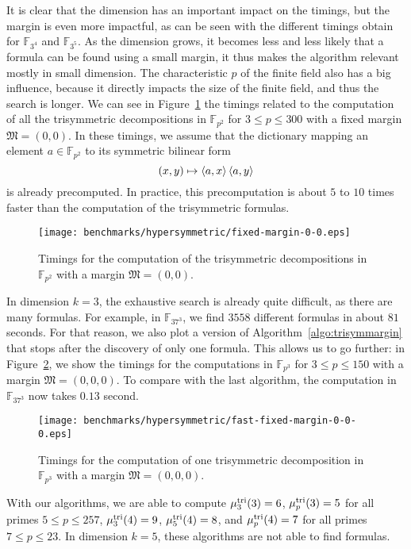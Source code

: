 It is clear that the dimension has an important impact on the timings, but the
margin is even more impactful, as can be seen with the different timings obtain
for $\mathbb{F}_{3^4}$ and $\mathbb{F}_{3^5}$. As the dimension grows, it
becomes less and less likely that a formula can be found using a small margin,
it thus makes the algorithm relevant mostly in small dimension. The
characteristic $p$ of the finite field also has a big influence, because it
directly impacts the size of the finite field, and thus the search is longer. We
can see in Figure~\ref{fig:fixed-margin-0-0} the timings related to the
computation of all the trisymmetric decompositions in $\mathbb{F}_{p^2}$ for
$3\leq p\leq 300$ with a fixed margin $\mathfrak M =(0,0)$. In these timings, we
assume that the dictionary mapping an element $a\in\mathbb{F}_{p^2}$ to its
symmetric bilinear form
\[
  (x,y)\mapsto\left\langle a,x\right\rangle\left\langle a,y\right\rangle
\]
is already precomputed. In practice, this precomputation is about $5$ to $10$
times faster than the computation of the trisymmetric formulas.
\begin{figure}
  \centering
  \texttt{[image: benchmarks/hypersymmetric/fixed-margin-0-0.eps]}
  \caption{Timings for the computation of the trisymmetric decompositions in
    $\mathbb{F}_{p^2}$ with a margin $\mathfrak M=(0,0)$.}
  \label{fig:fixed-margin-0-0}
\end{figure}
In dimension $k=3$, the exhaustive search is already quite difficult, as there
are many formulas. For example, in $\mathbb{F}_{37^3}$, we find $3558$ different
formulas in about $81$ seconds. For that reason, we also plot a version of
Algorithm~\ref{algo:trisymmargin} that stops after the discovery of only one formula.
This allows us to go further: in Figure~\ref{fig:fast-fixed-margin-0-0-0}, we
show the timings for the computations in $\mathbb{F}_{p^3}$ for $3\leq p\leq
150$ with a margin $\mathfrak M=(0,0,0)$. To compare with the last algorithm,
the computation in $\mathbb{F}_{37^3}$ now takes $0.13$ second.
\begin{figure}
  \centering
  \texttt{[image: benchmarks/hypersymmetric/fast-fixed-margin-0-0-0.eps]}
  \caption{Timings for the computation of one trisymmetric decomposition in
    $\mathbb{F}_{p^3}$ with a margin $\mathfrak M=(0,0,0)$.}
  \label{fig:fast-fixed-margin-0-0-0}
\end{figure}
With our algorithms, we are able to compute $\mu^{\textrm{tri}}_3(3)=6$,
$\mu^{\textrm{tri}}_p(3)=5$ for all primes $5\leq p\leq 257$,
$\mu^{\textrm{tri}}_3(4)=9$, $\mu^{\textrm{tri}}_5(4)=8$, and $\mu^{\textrm{tri}}_p(4)=7$ for all primes $7\leq p\leq 23$.
In dimension $k=5$, these algorithms are not able to find formulas.
